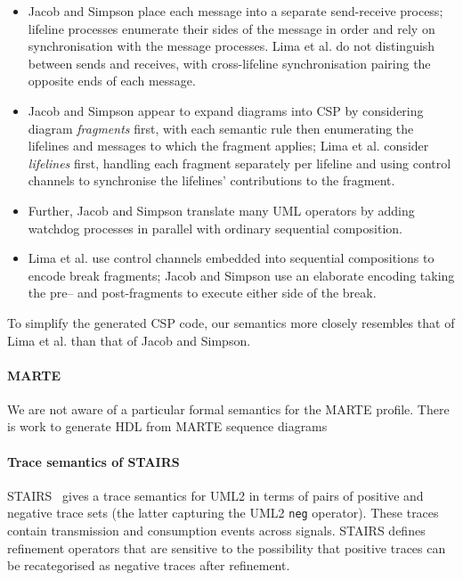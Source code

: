 \begin{itemize}
\item
  Jacob and Simpson place each message into a
  separate send-receive process; lifeline processes enumerate their
  sides of the message in order and rely on
  synchronisation with the message processes.
  Lima et al. do not
  distinguish between sends and receives, with
  cross-lifeline synchronisation pairing the opposite
  ends of each message.
\item
  Jacob and Simpson appear to expand diagrams into CSP by
  considering diagram \emph{fragments} first, with each semantic rule
  then enumerating the lifelines and messages to which the fragment applies;
  Lima et al. consider \emph{lifelines} first, handling each fragment
  separately per lifeline and using control channels to synchronise the
  lifelines' contributions to the fragment.
\item
  Further, Jacob and Simpson translate many UML operators by adding watchdog
  processes in parallel with ordinary sequential composition.
\item
  Lima et al. use control channels embedded into sequential compositions to
  encode break fragments;
  Jacob and Simpson use an elaborate encoding taking the pre-- and
  post-fragments to execute either side of the break.
\end{itemize}

To simplify the generated CSP code, our semantics more closely resembles that of
Lima et al. than that of Jacob and Simpson.

\paragraph{MARTE}

We are not aware of a particular formal semantics for the MARTE profile.
There is work to generate HDL from MARTE sequence diagrams~

\paragraph{Trace semantics of STAIRS}

STAIRS~\cite{Haugen03-STAIRS} gives a trace semantics for UML2 in terms
of pairs of positive and negative trace sets (the latter capturing the UML2
\texttt{neg} operator).  These traces contain
transmission and consumption events across signals.  STAIRS defines
refinement operators that are sensitive to the possibility that positive
traces can be recategorised as negative traces after refinement.

